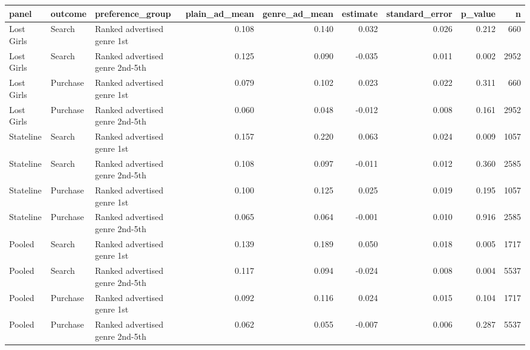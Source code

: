 \begin{tabular}{lllrrrrrr}
\toprule
panel & outcome & preference_group & plain_ad_mean & genre_ad_mean & estimate & standard_error & p_value & n \\
\midrule
Lost Girls & Search & Ranked advertised genre 1st & 0.108 & 0.140 & 0.032 & 0.026 & 0.212 & 660 \\
Lost Girls & Search & Ranked advertised genre 2nd-5th & 0.125 & 0.090 & -0.035 & 0.011 & 0.002 & 2952 \\
Lost Girls & Purchase & Ranked advertised genre 1st & 0.079 & 0.102 & 0.023 & 0.022 & 0.311 & 660 \\
Lost Girls & Purchase & Ranked advertised genre 2nd-5th & 0.060 & 0.048 & -0.012 & 0.008 & 0.161 & 2952 \\
Stateline & Search & Ranked advertised genre 1st & 0.157 & 0.220 & 0.063 & 0.024 & 0.009 & 1057 \\
Stateline & Search & Ranked advertised genre 2nd-5th & 0.108 & 0.097 & -0.011 & 0.012 & 0.360 & 2585 \\
Stateline & Purchase & Ranked advertised genre 1st & 0.100 & 0.125 & 0.025 & 0.019 & 0.195 & 1057 \\
Stateline & Purchase & Ranked advertised genre 2nd-5th & 0.065 & 0.064 & -0.001 & 0.010 & 0.916 & 2585 \\
Pooled & Search & Ranked advertised genre 1st & 0.139 & 0.189 & 0.050 & 0.018 & 0.005 & 1717 \\
Pooled & Search & Ranked advertised genre 2nd-5th & 0.117 & 0.094 & -0.024 & 0.008 & 0.004 & 5537 \\
Pooled & Purchase & Ranked advertised genre 1st & 0.092 & 0.116 & 0.024 & 0.015 & 0.104 & 1717 \\
Pooled & Purchase & Ranked advertised genre 2nd-5th & 0.062 & 0.055 & -0.007 & 0.006 & 0.287 & 5537 \\
\bottomrule
\end{tabular}
